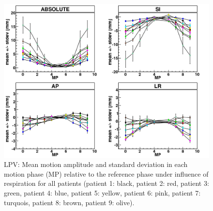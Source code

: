 \documentclass[type=dr, dr=rernat, accentcolor=tud7b,colorbacktitle, bigchapter, openright, twoside, 12pt ]{tudthesis}
\begin{document}

\newpage

\begin{figure}[H]
\begin{center}
 \includegraphics[scale=0.22]{MDACC_allPatients_RESP_LPV.png}
\caption{LPV: Mean motion amplitude and standard deviation in each motion phase (MP) relative to the reference phase under influence of 
respiration for all patients (patient 1: black, patient 2: red, patient 3: green, patient 4: blue, patient 5: yellow, patient 6: pink, patient 
7: turquois, patient 8: brown, patient 9: olive). }
\label{motion_resp_all_lpv}
\end{center}
\end{figure}

\vspace*{-1cm}
\end{document}
